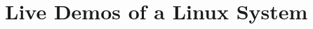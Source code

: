 \documentclass[10pt,t]{beamer}
\begin{document}




\section{Live Demos of a Linux System}
\end{document}
